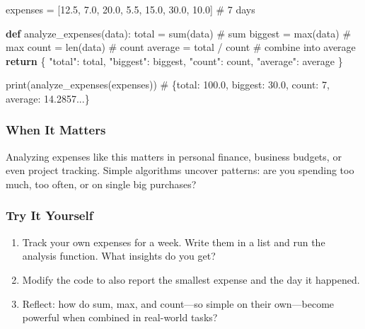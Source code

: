 \documentclass[
  letterpaper,
  DIV=11,
  numbers=noendperiod]{scrreprt}
\newenvironment{Shaded}{\begin{snugshade}}{\end{snugshade}}
\newcommand{\BuiltInTok}[1]{\textcolor[rgb]{0.00,0.23,0.31}{#1}}
\newcommand{\CommentTok}[1]{\textcolor[rgb]{0.37,0.37,0.37}{#1}}
\newcommand{\ControlFlowTok}[1]{\textcolor[rgb]{0.00,0.23,0.31}{\textbf{#1}}}
\newcommand{\FloatTok}[1]{\textcolor[rgb]{0.68,0.00,0.00}{#1}}
\newcommand{\KeywordTok}[1]{\textcolor[rgb]{0.00,0.23,0.31}{\textbf{#1}}}
\newcommand{\NormalTok}[1]{\textcolor[rgb]{0.00,0.23,0.31}{#1}}
\newcommand{\OperatorTok}[1]{\textcolor[rgb]{0.37,0.37,0.37}{#1}}
\newcommand{\StringTok}[1]{\textcolor[rgb]{0.13,0.47,0.30}{#1}}
\providecommand{\tightlist}{%
  \setlength{\itemsep}{0pt}\setlength{\parskip}{0pt}}
\begin{document}
\begin{Shaded}
\begin{Highlighting}[]
\NormalTok{expenses }\OperatorTok{=}\NormalTok{ [}\FloatTok{12.5}\NormalTok{, }\FloatTok{7.0}\NormalTok{, }\FloatTok{20.0}\NormalTok{, }\FloatTok{5.5}\NormalTok{, }\FloatTok{15.0}\NormalTok{, }\FloatTok{30.0}\NormalTok{, }\FloatTok{10.0}\NormalTok{]  }\CommentTok{\# 7 days}

\KeywordTok{def}\NormalTok{ analyze\_expenses(data):}
\NormalTok{    total }\OperatorTok{=} \BuiltInTok{sum}\NormalTok{(data)              }\CommentTok{\# sum}
\NormalTok{    biggest }\OperatorTok{=} \BuiltInTok{max}\NormalTok{(data)            }\CommentTok{\# max}
\NormalTok{    count }\OperatorTok{=} \BuiltInTok{len}\NormalTok{(data)              }\CommentTok{\# count}
\NormalTok{    average }\OperatorTok{=}\NormalTok{ total }\OperatorTok{/}\NormalTok{ count        }\CommentTok{\# combine into average}
    \ControlFlowTok{return}\NormalTok{ \{}
        \StringTok{"total"}\NormalTok{: total,}
        \StringTok{"biggest"}\NormalTok{: biggest,}
        \StringTok{"count"}\NormalTok{: count,}
        \StringTok{"average"}\NormalTok{: average}
\NormalTok{    \}}

\BuiltInTok{print}\NormalTok{(analyze\_expenses(expenses))}
\CommentTok{\# \{\textquotesingle{}total\textquotesingle{}: 100.0, \textquotesingle{}biggest\textquotesingle{}: 30.0, \textquotesingle{}count\textquotesingle{}: 7, \textquotesingle{}average\textquotesingle{}: 14.2857...\}}
\end{Highlighting}
\end{Shaded}

\subsubsection{When It Matters}\label{when-it-matters-98}

Analyzing expenses like this matters in personal finance, business
budgets, or even project tracking. Simple algorithms uncover patterns:
are you spending too much, too often, or on single big purchases?

\subsubsection{Try It Yourself}\label{try-it-yourself-100}

\begin{enumerate}
\def\labelenumi{\arabic{enumi}.}
\tightlist
\item
  Track your own expenses for a week. Write them in a list and run the
  analysis function. What insights do you get?
\item
  Modify the code to also report the smallest expense and the day it
  happened.
\item
  Reflect: how do sum, max, and count---so simple on their own---become
  powerful when combined in real-world tasks?
\end{enumerate}
\end{document}
